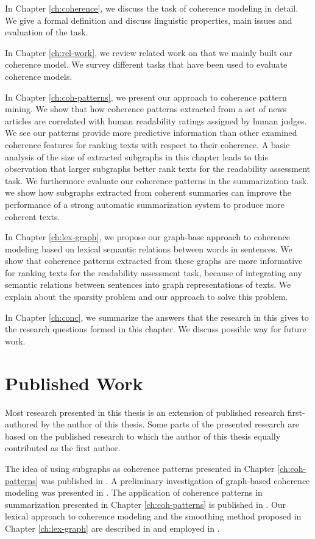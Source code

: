 In Chapter \ref{ch:coherence}, we discuss the task of coherence modeling in detail. 
We give a formal definition and discuss linguistic properties, main issues and evaluation of the task. 

In Chapter \ref{ch:rel-work}, we review related work on that we mainly built our coherence model. 
We survey different tasks that have been used to evaluate coherence models. 

In Chapter \ref{ch:coh-patterns}, we present our approach to coherence pattern mining. 
We show that how coherence patterns extracted from a set of news articles are correlated with human readability ratings assigned by human judges. 
We see our patterns provide more predictive information than other examined coherence features for ranking texts with respect to their coherence. 
A basic analysis of the size of extracted subgraphs in this chapter leads to this observation that larger subgraphs better rank texts for the readability assessment task. 
We furthermore evaluate our coherence patterns in the summarization task.  
we show how subgraphs extracted from coherent summaries can improve the performance of a strong automatic summarization system to produce more coherent texts. 

In Chapter \ref{ch:lex-graph}, we propose our graph-base approach to coherence modeling based on lexical semantic relations between words in sentences. 
We show that coherence patterns extracted from these graphs are more informative for ranking texts for the readability assessment task, because of integrating any semantic relations between sentences into graph representations of texts. 
We explain about the sparsity problem and our approach to solve this problem. 

In Chapter \ref{ch:conc}, we summarize the answers that the research in this gives to the research questions formed in this chapter. 
We discuss possible way for future work. 

\section{Published Work}
\label{sec:intro-published}

Most research presented in this thesis is an extension of published research first-authored by the author of this thesis. 
Some parts of the presented research are based on the published research to which the author of this thesis equally contributed as the first author. 

The idea of using subgraphs as coherence patterns presented in Chapter \ref{ch:coh-patterns} was published in . 
A preliminary investigation of graph-based coherence modeling was presented in . 
The application of coherence patterns in summarization presented in Chapter \ref{ch:coh-patterns} is published in . 
Our lexical approach to coherence modeling and the smoothing method proposed in Chapter \ref{ch:lex-graph} are described in  and employed in . 


